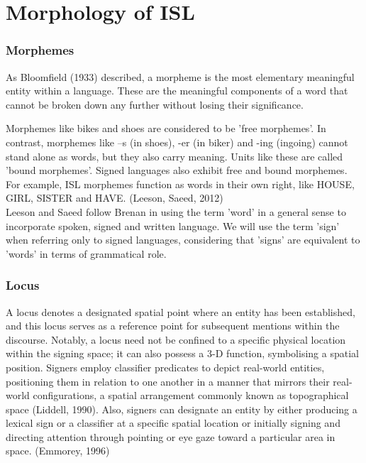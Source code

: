 \section{Morphology of ISL}

\subsubsection{Morphemes}

As Bloomfield (1933) described, a morpheme is the most elementary meaningful entity within a language. These are the meaningful components of a word that cannot be broken down any further without losing their significance.

Morphemes like bikes and shoes are considered to be 'free morphemes'. In contrast, morphemes like –s (in shoes), -er (in biker) and -ing (ingoing) cannot stand alone as words, but they also carry meaning. Units like these are called 'bound morphemes'. Signed languages also exhibit free and bound morphemes. For example, ISL morphemes function as words in their own right, like HOUSE, GIRL, SISTER and HAVE. (Leeson, Saeed, 2012) \\
Leeson and Saeed follow Brenan in using the term 'word' in a general sense to incorporate spoken, signed and written language. We will use the term 'sign' when referring only to signed languages, considering that 'signs' are equivalent to 'words' in terms of grammatical role. 


\subsubsection{Locus}

A locus denotes a designated spatial point where an entity has been established, and this locus serves as a reference point for subsequent mentions within the discourse. Notably, a locus need not be confined to a specific physical location within the signing space; it can also possess a 3-D function, symbolising a spatial position. Signers employ classifier predicates to depict real-world entities, positioning them in relation to one another in a manner that mirrors their real-world configurations, a spatial arrangement commonly known as topographical space (Liddell, 1990). Also, signers can designate an entity by either producing a lexical sign or a classifier at a specific spatial location or initially signing and directing attention through pointing or eye gaze toward a particular area in space. (Emmorey,  1996) 

